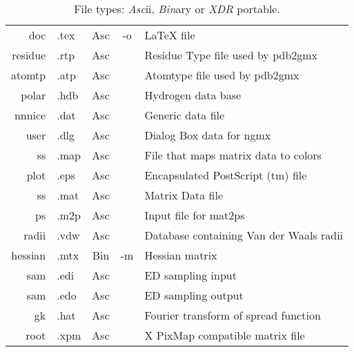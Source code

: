 \begin{table}[p]
\begin{tabularx}{\linewidth}{rlccX}
     doc &  .tex & Asc &    -o & LaTeX file \\
 residue &  .rtp & Asc &       & Residue Type file used by pdb2gmx \\
  atomtp &  .atp & Asc &       & Atomtype file used by pdb2gmx \\
   polar &  .hdb & Asc &       & Hydrogen data base \\
  nnnice &  .dat & Asc &       & Generic data file \\
    user &  .dlg & Asc &       & Dialog Box data for ngmx \\
      ss &  .map & Asc &       & File that maps matrix data to colors \\
    plot &  .eps & Asc &       & Encapsulated PostScript (tm) file \\
      ss &  .mat & Asc &       & Matrix Data file \\
      ps &  .m2p & Asc &       & Input file for mat2ps \\
   radii &  .vdw & Asc &       & Database containing Van der Waals radii \\
 hessian &  .mtx & Bin &    -m & Hessian matrix \\
     sam &  .edi & Asc &       & ED sampling input \\
     sam &  .edo & Asc &       & ED sampling output \\
      gk &  .hat & Asc &       & Fourier transform of spread function \\
    root &  .xpm & Asc &       & X PixMap compatible matrix file \\
\hline
\end{tabularx}
\caption{File types: {\em Asc\/}ii, {\em Bin\/}ary or {\em XDR\/} portable.}
\label{Tab:form}
\end{table}

